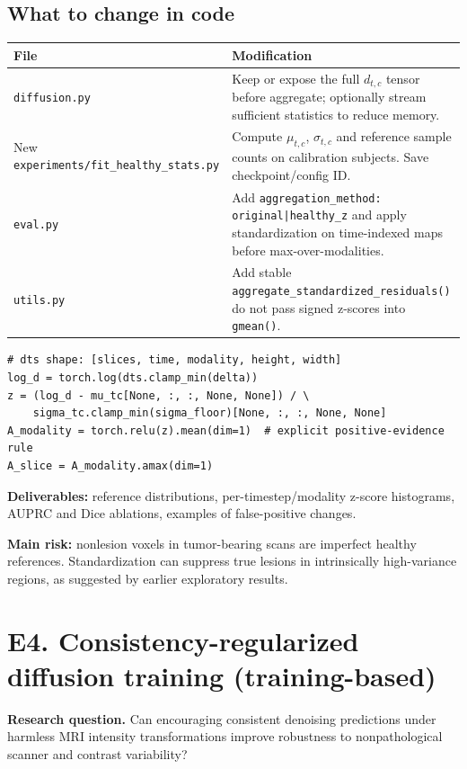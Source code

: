 \documentclass[10pt,a4paper]{article}
\newcommand{\file}[1]{\nolinkurl{#1}}
\newcommand{\hyps}[1]{\begin{summarybox}\textbf{Research question.} #1\end{summarybox}}
\begin{document}
\subsection{What to change in code}
\begin{tabularx}{\linewidth}{@{}p{39mm}X@{}}
\toprule File & Modification\\\midrule
\file{diffusion.py} & Keep or expose the full $d_{t,c}$ tensor before aggregate; optionally stream sufficient statistics to reduce memory.\\
New \file{experiments/fit_healthy_stats.py} & Compute $\mu_{t,c}$, $\sigma_{t,c}$ and reference sample counts on calibration subjects. Save checkpoint/config ID.\\
\file{eval.py} & Add \file{aggregation_method: original|healthy_z} and apply standardization on time-indexed maps before max-over-modalities.\\
\file{utils.py} & Add stable \file{aggregate_standardized_residuals()}\; do not pass signed z-scores into \file{gmean()}.\\\bottomrule
\end{tabularx}
\begin{lstlisting}
# dts shape: [slices, time, modality, height, width]
log_d = torch.log(dts.clamp_min(delta))
z = (log_d - mu_tc[None, :, :, None, None]) / \
    sigma_tc.clamp_min(sigma_floor)[None, :, :, None, None]
A_modality = torch.relu(z).mean(dim=1)  # explicit positive-evidence rule
A_slice = A_modality.amax(dim=1)
\end{lstlisting}
\textbf{Deliverables:} reference distributions, per-timestep/modality z-score histograms, AUPRC and Dice ablations, examples of false-positive changes.\par
\textbf{Main risk:} nonlesion voxels in tumor-bearing scans are imperfect healthy references. Standardization can suppress true lesions in intrinsically high-variance regions, as suggested by earlier exploratory results.
\Needspace{12\baselineskip}
\section{E4. Consistency-regularized diffusion training (training-based)}
\hyps{Can encouraging consistent denoising predictions under harmless MRI intensity transformations improve robustness to nonpathological scanner and contrast variability?}
\end{document}
